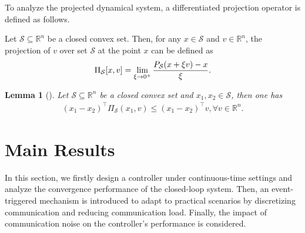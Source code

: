 \documentclass[final,5p,times,twocolumn,authoryear]{elsarticle}
\newtheorem{lemma}{ {Lemma}}
\begin{document}
	
	
	To analyze the projected dynamical system, a differentiated projection operator is defined as follows.
	
	\begin{definition} 
		Let $\mathcal{S} \subseteq \mathbb{R}^n$ be a closed convex set. Then, for any $x \in \mathcal{S}$ and $v\in\mathbb{R}^n$, the projection of $v$ over set $\mathcal{S}$ at the point $x$ can be defined as
		\begin{align}
			\Pi_\mathcal{S} [x,v] = \lim\limits_{\xi\to0^+} \frac{P_\mathcal{S}(x+\xi v)-x}{\xi}.\notag
		\end{align}
	\end{definition}

	\begin{lemma} [\citep{pater2017}]
		Let $\mathcal{S} \subseteq \mathbb{R}^n$ be a closed convex set and $x_1, x_2\in \mathcal{S}$, then one has
		\begin{align}
			(x_1-x_2)^\top \Pi_{\mathcal{S}}(x_1,v)\le (x_1-x_2)^\top v, \forall v\in \mathbb{R}^n.\label{eqle2}
		\end{align}
	\end{lemma}
	
	
	
	
	

\section{Main Results}\label{mai}
	
	 In this section, we firstly design a controller under continuous-time settings and analyze the convergence performance of the closed-loop system. Then, an event-triggered mechanism is introduced to adapt to practical scenarios by discretizing communication and reducing communication load. Finally, the impact of communication noise on the controller's performance is considered. 
	
\end{document}
